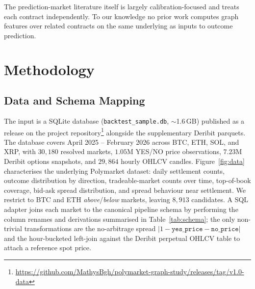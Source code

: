 \documentclass{article} %
\begin{document}
The prediction-market literature itself is largely calibration-focused \citep{wolfers2004} and treats each contract independently. To our knowledge no prior work computes graph features over related contracts on the same underlying as inputs to outcome prediction.

\section{Methodology}
\label{sec:methodology}

\subsection{Data and Schema Mapping}

The input is a SQLite database (\texttt{backtest\_sample.db}, $\sim$1.6\,GB) published as a release on the project repository\footnote{\url{https://github.com/MathysBgh/polymarket-graph-study/releases/tag/v1.0-data}} alongside the supplementary Deribit parquets. The database covers April 2025 -- February 2026 across BTC, ETH, SOL, and XRP, with $30{,}180$ resolved markets, $1.05$M YES/NO price observations, $7.23$M Deribit options snapshots, and $29{,}864$ hourly OHLCV candles. Figure~\ref{fig:data} characterises the underlying Polymarket dataset: daily settlement counts, outcome distribution by direction, tradeable-market counts over time, top-of-book coverage, bid-ask spread distribution, and spread behaviour near settlement. We restrict to BTC and ETH \emph{above}/\emph{below} markets, leaving $8{,}913$ candidates. A SQL adapter joins each market to the canonical pipeline schema by performing the column renames and derivations summarised in Table~\ref{tab:schema}; the only non-trivial transformations are the no-arbitrage spread $|1 - \texttt{yes\_price} - \texttt{no\_price}|$ and the hour-bucketed left-join against the Deribit perpetual OHLCV table to attach a reference spot price.
\end{document}

